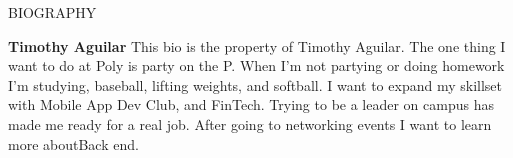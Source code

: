\documentclass{bio}%
\begin{document}
%
\normalsize%
\begin{flushleft}%
\newcommand{\EducationEntry}[1]{
                            {\bf California Polytechnic State University}
                            \hfill
                            {\em September {#1} - Present}
                        }%
\newcommand{\BoldHeading}[1]{
                            {\bf{#1}\sectionskip{\medskip}}
                        }%
\newcommand{\DatedEntry}[2]{
                            \item{#1} 
                            \hfill
                            {\em{#2}}
                        }%
\newcommand{\FirstDatedEntry}[2]{
                            \text{#1} 
                            \hfill
                            {\em{#2}}
                        }%
\begin{rSection}{BIOGRAPHY}%
\BoldHeading{Timothy Aguilar}%
\linebreak%
This bio is the property of Timothy Aguilar. The one thing I want to do at Poly is party on the P. When I'm not partying or doing homework I'm studying, baseball, lifting weights, and softball.  I want to expand my skillset with Mobile App Dev Club, and FinTech. Trying to be a leader on campus has made me ready for a real job. After going to networking events I want to learn more aboutBack end. %
\end{rSection}%
\end{flushleft}%
\end{document}
